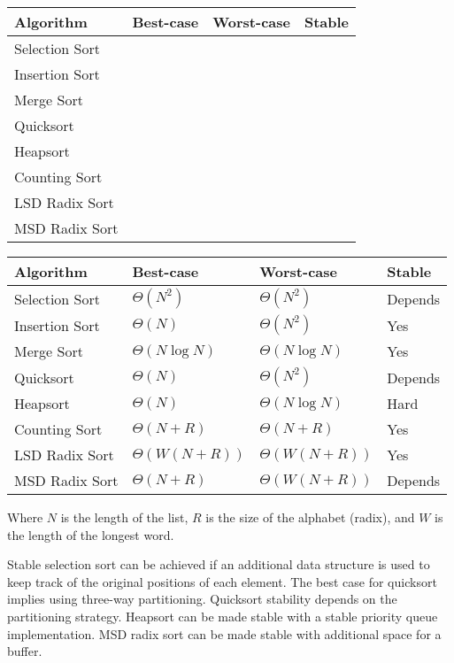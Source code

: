 \ifprintanswers\else
{
\renewcommand{\arraystretch}{2}
\setlength{\tabcolsep}{12pt}
\begin{tabularx}{\textwidth}{Xlll}
Algorithm         & Best-case & Worst-case & Stable \\\hline
Selection Sort    &           &            &        \\
Insertion Sort    &           &            &        \\
Merge Sort        &           &            &        \\
Quicksort         &           &            &        \\
Heapsort          &           &            &        \\
Counting Sort     &           &            &        \\
LSD Radix Sort    &           &            &        \\
MSD Radix Sort    &           &            &
\end{tabularx}
}
\fi

\begin{solution}
{
\renewcommand{\arraystretch}{2}
\setlength{\tabcolsep}{12pt}
\begin{tabularx}{\textwidth}{Xlll}
Algorithm         & Best-case          & Worst-case          & Stable \\\hline
Selection Sort    & $\Theta(N^2)$      & $\Theta(N^2)$       & Depends\\
Insertion Sort    & $\Theta(N)$        & $\Theta(N^2)$       & Yes    \\
Merge Sort        & $\Theta(N \log N)$ & $\Theta(N \log N)$  & Yes    \\
Quicksort         & $\Theta(N)$        & $\Theta(N^2)$       & Depends\\
Heapsort          & $\Theta(N)$        & $\Theta(N \log N)$  & Hard   \\
Counting Sort     & $\Theta(N + R)$    & $\Theta(N + R)$     & Yes    \\
LSD Radix Sort    & $\Theta(W(N + R))$ & $\Theta(W(N + R))$  & Yes    \\
MSD Radix Sort    & $\Theta(N + R)$    & $\Theta(W(N + R))$  & Depends\\
\end{tabularx}
}

Where $N$ is the length of the list, $R$ is the size of the alphabet (radix),
and $W$ is the length of the longest word.

Stable selection sort can be achieved if an additional data structure is used
to keep track of the original positions of each element. The best case for
quicksort implies using three-way partitioning. Quicksort stability depends on
the partitioning strategy. Heapsort can be made stable with a stable priority
queue implementation. MSD radix sort can be made stable with additional space
for a buffer.
\end{solution}
